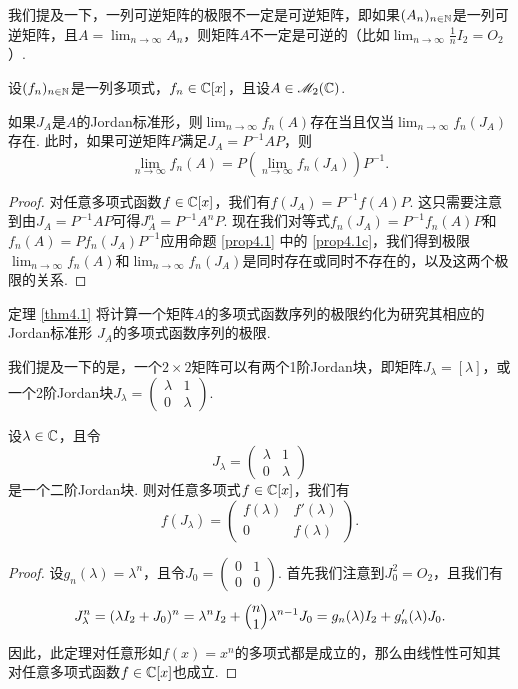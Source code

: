 \begin{remark}
  我们提及一下，一列可逆矩阵的极限不一定是可逆矩阵，即如果$(A_n)_{n\in\mathbb N}$是一列可逆矩阵，且$A=\lim_{n\to\infty}A_n$，则矩阵$A$不一定是可逆的（比如$\lim_{n\to\infty}\frac1nI_2=O_2$）.
\end{remark}

设$(f_n)_{n\in\mathbb N}$是一列多项式，$f_n\in\mathbb C[x]$，且设$A\in\mathscr M_2(\mathbb C)$.
\begin{theorem}
  如果$J_A$是$A$的Jordan标准形，则$\lim_{n\to\infty}f_n(A)$存在当且仅当$\lim_{n\to\infty}f_n(J_A)$存在. 此时，如果可逆矩阵$P$满足$J_A=P^{-1}AP$，则
  \[
    \lim_{n\to\infty} f_n(A) = P\left( \lim_{n\to\infty}f_n(J_A) \right) P^{-1}.
  \]
\end{theorem}

\begin{proof}
  对任意多项式函数$f\in \mathbb C[x]$，我们有$f(J_A)=P^{-1}f(A)P$. 这只需要注意到由$J_A=P^{-1}AP$可得$J_A^n=P^{-1}A^nP$. 现在我们对等式$f_n(J_A)=P^{-1}f_n(A)P$和$f_n(A)=Pf_n(J_A)P^{-1}$应用命题 \ref{prop4.1} 中的 \ref{prop4.1c}，我们得到极限$\lim_{n\to\infty}f_n(A)$和$\lim_{n\to\infty}f_n(J_A)$是同时存在或同时不存在的，以及这两个极限的关系.
\end{proof}

\begin{remark}
  定理 \ref{thm4.1} 将计算一个矩阵$A$的多项式函数序列的极限约化为研究其相应的Jordan标准形 $J_A$的多项式函数序列的极限.
\end{remark}

我们提及一下的是，一个$2\times2$矩阵可以有两个1阶Jordan块，即矩阵$J_\lambda=[\lambda]$，或一个2阶Jordan块$J_\lambda=\begin{pmatrix}
  \lambda & 1 \\
  0 & \lambda
\end{pmatrix}$.

\begin{theorem}
  设$\lambda\in\mathbb C$，且令
  \[
    J_\lambda = \begin{pmatrix}
      \lambda & 1 \\
      0 & \lambda
    \end{pmatrix}
  \]
  是一个二阶Jordan块. 则对任意多项式$f\in\mathbb C[x]$，我们有
  \[
    f(J_\lambda) = \begin{pmatrix}
      f(\lambda) & f'(\lambda) \\
      0 & f(\lambda)
    \end{pmatrix}.
  \]
\end{theorem}
\begin{proof}
  设$g_n(\lambda)=\lambda^n$，且令$J_0=\begin{pmatrix}
    0 & 1 \\
    0 & 0
  \end{pmatrix}$. 首先我们注意到$J_0^2=O_2$，且我们有
  \[
    J_\lambda^n = (\lambda I_2 + J_0)^n = \lambda^nI_2 + \Binom n1\lambda^{n-1}J_0 = g_n(\lambda)I_2 + g_n'(\lambda)J_0.
  \]
  因此，此定理对任意形如$f(x)=x^n$的多项式都是成立的，那么由线性性可知其对任意多项式函数$f\in\mathbb C[x]$也成立.
\end{proof}

